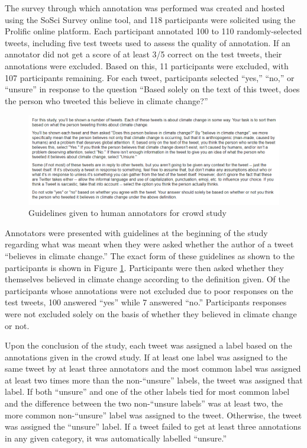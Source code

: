 \documentclass[article,oneside,a4paper,12pt]{memoir}
\begin{document}
The survey through which annotation was performed was created and hosted using the SoSci Survey online tool, and 118 participants were solicited using the Prolific online platform. Each participant annotated 100 to 110 randomly-selected tweets, including five test tweets used to assess the quality of annotation. If an annotator did not get a score of at least 3/5 correct on the test tweets, their annotations were excluded. Based on this, 11 participants were excluded, with 107 participants remaining. For each tweet, participants selected ``yes,'' ``no,'' or ``unsure'' in response to the question ``Based solely on the text of this tweet, does the person who tweeted this believe in climate change?'' 

\begin{figure}[hbt]
    \begin{adjustbox}{width=1.2\textwidth,center=\textwidth}
    \includegraphics[width=1.2\textwidth,frame]{annotation-guidelines}
    \end{adjustbox}
        \caption{Guidelines given to human annotators for crowd study}
        \label{fig:annotation}
    \end{figure}

Annotators were presented with guidelines at the beginning of the study regarding what was meant when they were asked whether the author of a tweet ``believes in climate change.'' The exact form of these guidelines as shown to the participants is shown in Figure \ref{fig:annotation}. Participants were then asked whether they themselves believed in climate change according to the definition given. Of the participants whose annotations were not excluded due to poor responses on the test tweets, 100 answered ``yes'' while 7 answered ``no.'' Participants responses were not excluded solely on the basis of whether they believed in climate change or not.

Upon the conclusion of the study, each tweet was assigned a label based on the annotations given in the crowd study. If at least one label was assigned to the same tweet by at least three annotators and the most common label was assigned at least two times more than the non-``unsure'' labels, the tweet was assigned that label. If both ``unsure'' and one of the other labels tied for most common label and the difference between the two non-``unsure labels'' was at least two, the more common non-``unsure'' label was assigned to the tweet. Otherwise, the tweet was assigned the ``unsure'' label. If a tweet failed to get at least three annotations in any given category, it was automatically labelled ``unsure.'' 
\end{document}
